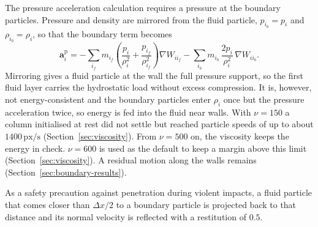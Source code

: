 The pressure acceleration calculation requires a pressure at the boundary particles. 
Pressure and density are mirrored from the fluid particle,
$p_{i_b} = p_i$ and $\rho_{i_b} = \rho_i$, so that the boundary term becomes
\begin{equation}
    \boldsymbol{a}_i^\mathrm{p} = -\sum_{i_f} m_{i_f}\left(\frac{p_i}{\rho_i^2} + \frac{p_{i_f}}{\rho_{i_f}^2}\right)\nabla W_{i i_f}
    - \sum_{i_b} m_{i_b}\,\frac{2p_i}{\rho_i^2}\,\nabla W_{i i_b}.
    \label{eq:mirroring}
\end{equation}
Mirroring gives a fluid particle at the wall the full pressure support, so the
first fluid layer carries the hydrostatic load without excess compression. It
is, however, not energy-consistent and the boundary particles enter $\rho_i$ once but
the pressure acceleration twice, so energy is fed into the fluid near walls.
With $\nu = 150$ a column initialised at rest did not settle but
reached particle speeds of up to about $1400\,\mathrm{px/s}$
(Section~\ref{sec:viscosity}). From $\nu = 500$ on, the viscosity keeps the energy in check.
 $\nu = 600$ is used as the default to keep a
margin above this limit (Section~\ref{sec:viscosity}). A residual
motion along the walls remains (Section~\ref{sec:boundary-results}).

As a safety precaution against penetration during violent impacts, a fluid particle
that comes closer than $\Delta x/2$ to a boundary particle is projected back to
that distance and its normal velocity is reflected with a restitution of $0.5$.


